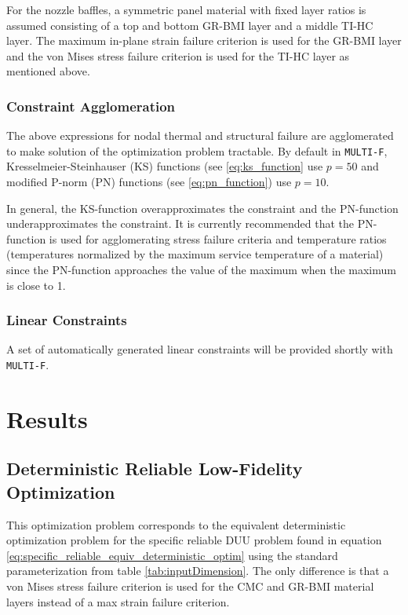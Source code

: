 \documentclass{article}
\begin{document}
For the nozzle baffles, a symmetric panel material with fixed layer ratios is assumed consisting of a top and bottom GR-BMI layer and a middle TI-HC layer. The maximum in-plane strain failure criterion is used for the GR-BMI layer and the von Mises stress failure criterion is used for the TI-HC layer as mentioned above.

\subsubsection{Constraint Agglomeration}

The above expressions for nodal thermal and structural failure are agglomerated to make solution of the optimization problem tractable. By default in \texttt{MULTI-F}, Kresselmeier-Steinhauser (KS) functions (see \ref{eq:ks_function} use $p = 50$ and modified P-norm (PN) functions (see \ref{eq:pn_function}) use $p = 10$.

In general, the KS-function overapproximates the constraint and the PN-function underapproximates the constraint. It is currently recommended that the PN-function is used for agglomerating stress failure criteria and temperature ratios (temperatures normalized by the maximum service temperature of a material) since the PN-function approaches the value of the maximum when the maximum is close to 1.

\subsubsection{Linear Constraints}

A set of automatically generated linear constraints will be provided shortly with \texttt{MULTI-F}.

\section{Results} \label{sec:results}

\subsection{Deterministic Reliable Low-Fidelity Optimization}

This optimization problem corresponds to the equivalent deterministic optimization problem for the specific reliable DUU problem found in equation \ref{eq:specific_reliable_equiv_deterministic_optim} using the standard parameterization from table \ref{tab:inputDimension}. The only difference is that a von Mises stress failure criterion is used for the CMC and GR-BMI material layers instead of a max strain failure criterion.
\end{document}
